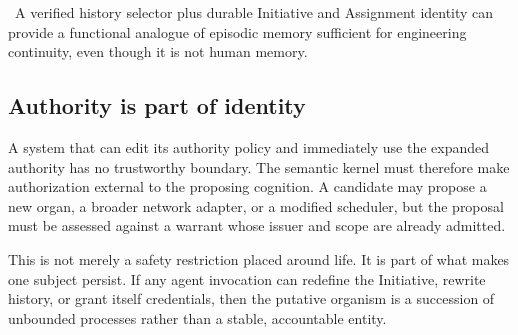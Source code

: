 \inferencelabel\ A verified history selector plus durable Initiative and
Assignment identity can provide a functional analogue of episodic memory
sufficient for engineering continuity, even though it is not human memory.

\subsection{Authority is part of identity}

A system that can edit its authority policy and immediately use the expanded
authority has no trustworthy boundary. The semantic kernel must therefore
make authorization external to the proposing cognition. A candidate may
propose a new organ, a broader network adapter, or a modified scheduler, but
the proposal must be assessed against a warrant whose issuer and scope are
already admitted.

This is not merely a safety restriction placed around life. It is part of what
makes one subject persist. If any agent invocation can redefine the Initiative,
rewrite history, or grant itself credentials, then the putative organism is a
succession of unbounded processes rather than a stable, accountable entity.
